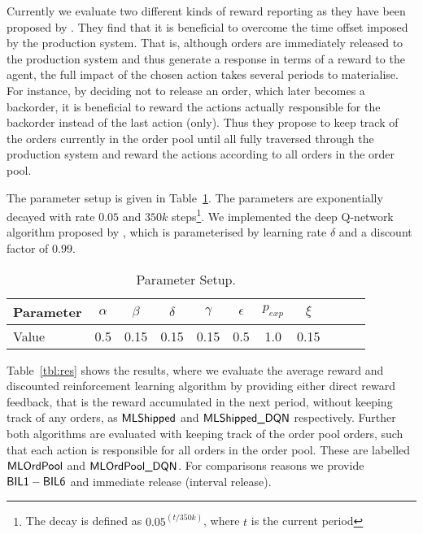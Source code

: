 \documentclass[envcountsame]{llncs}
\begin{document}
Currently we evaluate two different kinds of reward reporting as they have been proposed by
\cite{Schneckenreither2019}. They find that it is beneficial to overcome the time offset imposed by
the production system. That is, although orders are immediately released to the production system
and thus generate a response in terms of a reward to the agent, the full impact of the chosen action
takes several periods to materialise. For instance, by deciding not to release an order, which later
becomes a backorder, it is beneficial to reward the actions actually responsible for the backorder
instead of the last action (only). Thus they propose to keep track of the orders currently in the
order pool until all fully traversed through the production system and reward the actions according
to all orders in the order pool.

The parameter setup is given in Table~\ref{tbl:params}. The parameters are exponentially decayed
with rate \(0.05\) and \(350k\) steps\footnote{The decay is defined as \(0.05 ^{(t/350k)}\), where
  \(t\) is the current period}. We implemented the deep Q-network algorithm proposed by
\cite{mnih2015human}, which is parameterised by learning rate \(\delta\) and a discount factor of
\(0.99\).


\begin{table}[t]
  \centering

  \begin{tabular}{|l||c|c|c|c|c|c|c|c|c|c|}
    \hline
    Parameter & $\alpha$ & $\beta$ & $\delta$ & $\gamma$ & $\epsilon$ & $p_{exp}$ & $\xi$ \\
    \hline
    Value & 0.5 & 0.15 & 0.15 & 0.15 & 0.5 & 1.0 & 0.15 \\
    \hline
  \end{tabular}


  \caption{\label{tbl:params}Parameter Setup.}
\end{table}


Table~\ref{tbl:res} shows the results, where we evaluate the average reward and discounted
reinforcement learning algorithm by providing either direct reward feedback, that is the reward
accumulated in the next period, without keeping track of any orders, as \(\textsf{MLShipped}\) and
\(\textsf{MLShipped\_DQN}\) respectively. Further both algorithms are evaluated with keeping track of the
order pool orders, such that each action is responsible for all orders in the order pool. These are
labelled \(\textsf{MLOrdPool}\) and \(\textsf{MLOrdPool\_DQN}\). For comparisons reasons we provide
\(\textsf{BIL1}-\textsf{BIL6}\) and immediate release (interval release).
\end{document}
